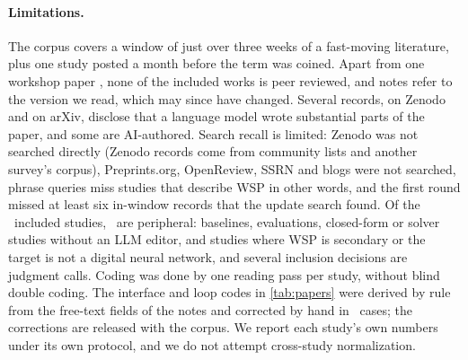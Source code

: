\paragraph{Limitations.} The corpus covers a window of just over three weeks of a fast-moving literature, plus one study posted a month before the term was coined. Apart from one workshop paper \citep{ax2610_07334}, none of the included works is peer reviewed, and notes refer to the version we read, which may since have changed. Several records, on Zenodo and on arXiv, disclose that a language model wrote substantial parts of the paper, and some are AI-authored. Search recall is limited: Zenodo was not searched directly (Zenodo records come from community lists and another survey's corpus), Preprints.org, OpenReview, SSRN and blogs were not searched, phrase queries miss studies that describe WSP in other words, and the first round missed at least six in-window records that the update search found. Of the \nIncluded\ included studies, \nPeripheral\ are peripheral: baselines, evaluations, closed-form or solver studies without an LLM editor, and studies where WSP is secondary or the target is not a digital neural network, and several inclusion decisions are judgment calls. Coding was done by one reading pass per study, without blind double coding. The interface and loop codes in \cref{tab:papers} were derived by rule from the free-text fields of the notes and corrected by hand in \nCodeOverrides\ cases; the corrections are released with the corpus. We report each study's own numbers under its own protocol, and we do not attempt cross-study normalization.

